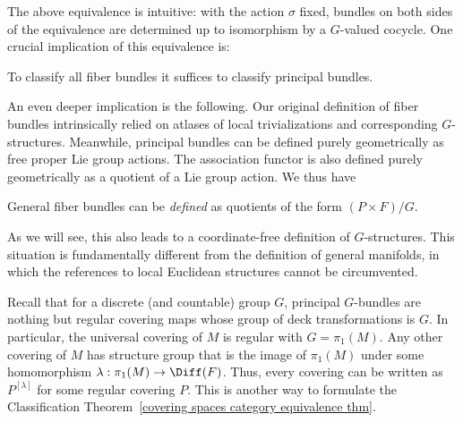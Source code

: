 \begin{rem}
    The above equivalence is intuitive: with the action $\sigma$ fixed, bundles on both sides of the equivalence are determined up to isomorphism by a $G$-valued cocycle. One crucial implication of this equivalence is:
    \begin{center}
        To classify all fiber bundles it suffices to classify principal bundles.
    \end{center}
    An even deeper implication is the following. Our original definition of fiber bundles intrinsically relied on atlases of local trivializations and corresponding $G$-structures. Meanwhile, principal bundles can be defined purely geometrically as free proper Lie group actions. The association functor is also defined purely geometrically as a quotient of a Lie group action. We thus have
    \begin{center}
        General fiber bundles can be \emph{defined} as quotients of the form $(P\times F)\slash G$.
    \end{center}
    As we will see, this also leads to a coordinate-free definition of $G$-structures. This situation is fundamentally different from the definition of general manifolds, in which the references to local Euclidean structures cannot be circumvented.
\end{rem}

\begin{example}
    Recall that for a discrete (and countable) group $G$, principal $G$-bundles are nothing but regular covering maps whose group of deck transformations is $G$. In particular, the universal covering of $M$ is regular with $G=\pi_1(M)$. Any other covering of $M$ has structure group that is the image of $\pi_1(M)$ under some homomorphism $\lambda:\pi_1(M)\to \Diff(F)$. Thus, every covering can be written as $P^{[\lambda]}$ for some regular covering $P$. This is another way to formulate the Classification Theorem~\ref{covering spaces category equivalence thm}. 
\end{example}




